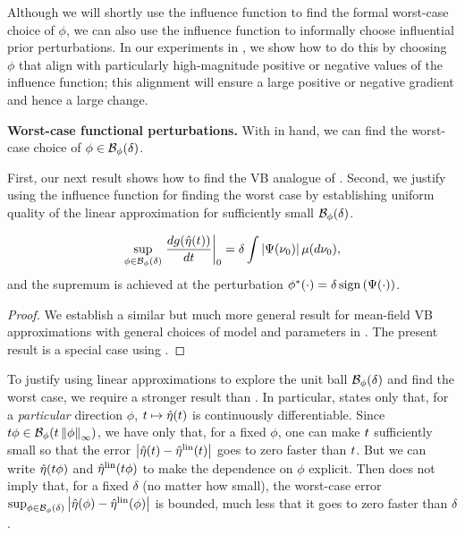 Although we will shortly use the influence function to find the formal
worst-case choice of $\phi$, we can also use the influence function to
informally choose influential prior perturbations. In our experiments in
, we show how to do this by choosing $\phi$ that align with
particularly high-magnitude positive or negative values of the influence
function; this alignment will ensure a large positive or negative gradient and
hence a large change.

\noindent \textbf{Worst-case functional perturbations.}
%
With  in hand, we can find the worst-case
choice of $\phi \in \mathcal{B}_\phi(\delta)$.

\LinfExamplesFig{}


First, our next result shows how to
find the VB analogue of \citet[Result 11]{gustafson:1996:local}. Second, we
justify using the influence function for finding the worst case by establishing
uniform quality of the linear approximation for sufficiently small
$\mathcal{B}_\phi(\delta)$.

\begin{cor}
\begin{align*}
%
\sup_{\phi \in \ball_\phi(\delta)}
    \fracat{d g(\etaopt(\t))}{d \t}{0} =
        \delta \int \abs{\infl(\nu_0)} \mu(d\nu_0),
%
\end{align*}
%
and the supremum is achieved at the perturbation
$\phi^*(\cdot) = \delta \, \mathrm{sign}\left(\Psi(\cdot)\right)$.
%
\end{cor}
%
\begin{proof}
%
%
We establish a similar but much more general result for mean-field VB
approximations with general choices of model and parameters in
. The present result is a special case using
.
%
\end{proof}

To justify using linear approximations to explore the unit ball
$\mathcal{B}_\phi(\delta)$ and find the worst case, we require a stronger result than
. In particular,  states
only that, for a {\em particular} direction $\phi$, $t \mapsto \hat\eta(t)$ is
continuously differentiable.  Since $t \phi \in \mathcal{B}_\phi(t \left\Vert\phi\right\Vert_{\infty})$,
we have only that, for a fixed $\phi$, one can make $t$ sufficiently small so
that the error $\left|\hat\eta(t) - \hat\eta^{\mathrm{lin}}(t)\right|$ goes to zero faster than $t$.
But we can write $\hat\eta(t\phi)$ and $\hat\eta^{\mathrm{lin}}(t \phi)$ to make the dependence
on $\phi$ explicit. Then  does not imply that, for a
fixed $\delta$ (no matter how small), the worst-case error $\sup_{\phi \in
\mathcal{B}_\phi(\delta)} \left|\hat\eta(\phi) - \hat\eta^{\mathrm{lin}}(\phi)\right|$ is bounded, much less
that it goes to zero faster than $\delta$.

